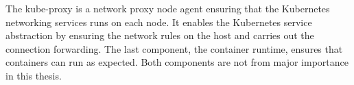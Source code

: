 The kube-proxy is a network proxy node agent ensuring that the Kubernetes networking services runs on each node. It enables the Kubernetes service abstraction by ensuring the network rules on the host and carries out the connection forwarding. The last component, the container runtime, ensures that containers can run as expected. Both components are not from major importance in this thesis.



